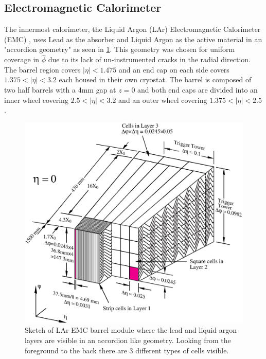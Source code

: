\subsection{Electromagnetic Calorimeter}

The innermost calorimeter, the Liquid Argon (LAr) Electromagnetic Calorimeter
(EMC) \cite{PERF-2007-01}, uses Lead as the absorber and Liquid Argon as the
active material in an "accordion geometry" as seen in \cref{fig:accordion}.
This geometry was chosen for uniform coverage in $\hat{\phi}$ due to its lack
of un-instrumented cracks in the radial direction.  The barrel region covers
$|\eta| < 1.475$ and an end cap on each side covers $1.375 < |\eta| < 3.2$ each
housed in their own cryostat.  The barrel is composed of two half barrels with
a 4mm gap at $z = 0$ and both end caps are divided into an inner wheel
covering $2.5 < |\eta| < 3.2$ and an outer wheel covering $1.375 < |\eta| <
2.5$.

\begin{figure}[!htbp]
  \begin{center}
    \includegraphics[width=0.8\linewidth]{figures/atlas/accordion}
    \caption{ \cite{PERF-2007-01} Sketch of LAr EMC barrel module where the lead
and liquid argon layers are visible in an accordion like geometry. Looking from
the foreground to the back there are 3 different types of cells visible.}
    \label{fig:accordion}
  \end{center}
\end{figure}

